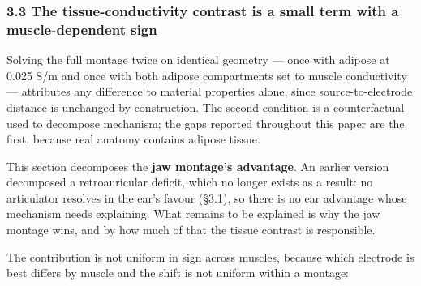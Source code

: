 \documentclass[
  11pt,
  letterpaper,
]{article}
\begin{document}
\subsubsection{3.3 The tissue-conductivity contrast is a small term with a muscle-dependent sign}\label{the-tissue-conductivity-contrast-is-a-small-term-with-a-muscle-dependent-sign}

Solving the full montage twice on identical geometry --- once with adipose at
0.025 S/m and once with both adipose compartments set to muscle conductivity ---
attributes any difference to material properties alone, since source-to-electrode
distance is unchanged by construction. The second condition is a counterfactual
used to decompose mechanism; the gaps reported throughout this paper are the
first, because real anatomy contains adipose tissue.

This section decomposes the \textbf{jaw montage's advantage}. An earlier version
decomposed a retroauricular deficit, which no longer exists as a result: no
articulator resolves in the ear's favour (§3.1), so there is no ear advantage
whose mechanism needs explaining. What remains to be explained is why the jaw
montage wins, and by how much of that the tissue contrast is responsible.

The contribution is not uniform in sign across muscles, because which electrode
is best differs by muscle and the shift is not uniform within a montage:
\end{document}

